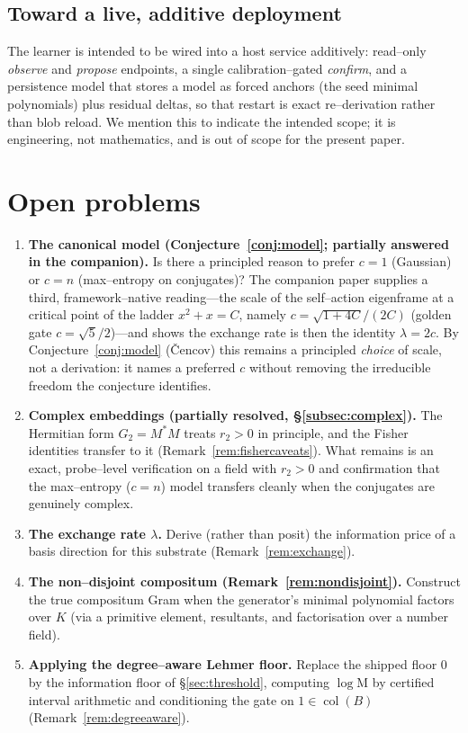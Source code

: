 \documentclass[11pt]{article}
\theoremstyle{plain}
\theoremstyle{definition}
\theoremstyle{remark}
\newcommand{\K}{K}
\newcommand{\Mah}{\mathrm{M}}
\newcommand{\BB}{B}
\DeclareMathOperator{\col}{col}
\begin{document}
\subsection{Toward a live, additive deployment}
The learner is intended to be wired into a host service additively: read--only \emph{observe} and
\emph{propose} endpoints, a single calibration--gated \emph{confirm}, and a persistence model that stores a
model as forced anchors (the seed minimal polynomials) plus residual deltas, so that restart is exact
re--derivation rather than blob reload. We mention this to indicate the intended scope; it is engineering,
not mathematics, and is out of scope for the present paper.

\section{Open problems}\label{sec:open}

\begin{enumerate}[label=(O\arabic*),leftmargin=*]
  \item \textbf{The canonical model (Conjecture~\ref{conj:model}; partially answered in the companion).}
        Is there a principled reason to prefer $c=1$ (Gaussian) or $c=n$ (max--entropy on conjugates)? The
        companion paper supplies a third, framework--native reading---the scale of the self--action eigenframe
        at a critical point of the ladder $x^2+x=C$, namely $c=\sqrt{1+4C}/(2C)$ (golden gate $c=\sqrt5/2$)---and
        shows the exchange rate is then the identity $\lambda=2c$. By Conjecture~\ref{conj:model} (\v{C}encov)
        this remains a principled \emph{choice} of scale, not a derivation: it names a preferred $c$ without
        removing the irreducible freedom the conjecture identifies.
  \item \textbf{Complex embeddings (partially resolved, \S\ref{subsec:complex}).} The Hermitian form
        $G_2=M^{*}M$ treats $r_2>0$ in principle, and the Fisher identities transfer to it
        (Remark~\ref{rem:fishercaveats}). What remains is an exact, probe--level verification on a field with
        $r_2>0$ and confirmation that the max--entropy ($c=n$) model transfers cleanly when the conjugates
        are genuinely complex.
  \item \textbf{The exchange rate $\lambda$.} Derive (rather than posit) the information price of a basis
        direction for this substrate (Remark~\ref{rem:exchange}).
  \item \textbf{The non--disjoint compositum (Remark~\ref{rem:nondisjoint}).} Construct the true compositum
        Gram when the generator's minimal polynomial factors over $\K$ (via a primitive element, resultants,
        and factorisation over a number field).
  \item \textbf{Applying the degree--aware Lehmer floor.} Replace the shipped floor $0$ by the
        information floor of \S\ref{sec:threshold}, computing $\log\Mah$ by certified interval arithmetic and
        conditioning the gate on $1\in\col(\BB)$ (Remark~\ref{rem:degreeaware}).
\end{enumerate}
\end{document}

